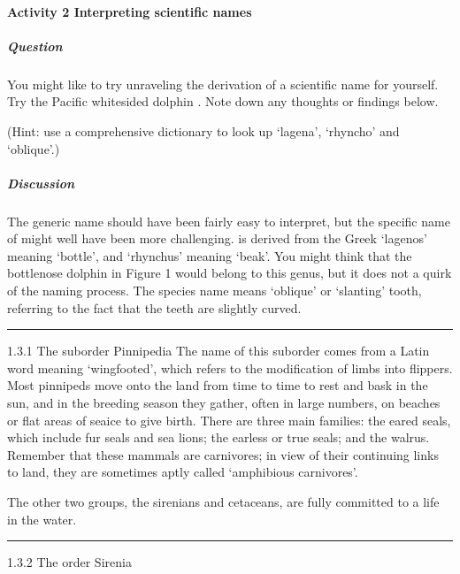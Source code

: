 \documentclass[letterpaper,10pt,english]{sphinxmanual}
\begin{document}
\paragraph{Activity 2 Interpreting scientific names}
\label{\detokenize{content/session_00/Part_00_01:Activity-2-Interpreting-scientific-names}}


\subparagraph{Question}
\label{\detokenize{content/session_00/Part_00_01:id4}}
You might like to try unraveling the derivation of a scientific name for yourself. Try the Pacific white\sphinxhyphen{}sided dolphin . Note down any thoughts or findings below.

(Hint: use a comprehensive dictionary to look up ‘lagena’, ‘rhyncho\sphinxhyphen{}’ and ‘oblique’.)


\subparagraph{Discussion}
\label{\detokenize{content/session_00/Part_00_01:id5}}
The generic name  should have been fairly easy to interpret, but the specific name of  might well have been more challenging.  is derived from the Greek ‘lagenos’ meaning ‘bottle’, and ‘rhynchus’ meaning ‘beak’. You might think that the bottlenose dolphin in Figure 1 would belong to this genus, but it does not \textendash{} a quirk of the naming process. The species name  means ‘oblique’ or ‘slanting’ tooth, referring to the fact that the teeth are
slightly curved.


\bigskip\hrule\bigskip


1.3.1 The suborder Pinnipedia The name of this suborder comes from a Latin word meaning ‘wing\sphinxhyphen{}footed’, which refers to the modification of limbs into flippers. Most pinnipeds move onto the land from time to time to rest and bask in the sun, and in the breeding season they gather, often in large numbers, on beaches or flat areas of sea\sphinxhyphen{}ice to give birth. There are three main families: the eared seals, which include fur seals and sea lions; the earless or true seals; and the walrus. Remember that
these mammals are carnivores; in view of their continuing links to land, they are sometimes aptly called ‘amphibious carnivores’.

The other two groups, the sirenians and cetaceans, are fully committed to a life in the water.


\bigskip\hrule\bigskip


1.3.2 The order Sirenia
\end{document}
